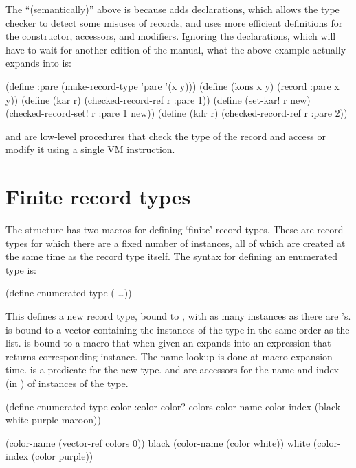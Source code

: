 The ``(semantically)'' above is because  adds
 declarations, which allows the type checker to detect some misuses of records,
 and uses more efficient definitions for the constructor, accessors, and
 modifiers.
Ignoring the declarations, which will have to wait for another edition of
 the manual, what the above example actually expands into is:
\begin{example}
(define :pare (make-record-type 'pare '(x y)))
(define (kons x y) (record :pare x y))
(define (kar r) (checked-record-ref r :pare 1))
(define (set-kar! r new)
  (checked-record-set! r :pare 1 new))
(define (kdr r) (checked-record-ref r :pare 2))
\end{example} 
 and  are
 low-level procedures that check the type of the
 record and access or modify it using a single VM instruction.

\section{Finite record types}

The structure  has
 two macros for defining `finite' record types.
These are record types for which there are a fixed number of instances,
 all of which are created at the same time as the record type itself.
The syntax for defining an enumerated type is:
\begin{example}
(define-enumerated-type  
  ( \ldots))
\end{example}
This defines a new record type, bound to , with as many
 instances as there are 's.
 is bound to a vector containing the instances
 of the type in the same order as the  list.
 is bound to a macro that when given an  expands
 into an expression that returns corresponding instance.
The name lookup is done at macro expansion time.
 is a predicate for the new type.
 and  are accessors for the
 name and index (in ) of instances of the type.

\begin{example}
(define-enumerated-type color :color
  color?
  colors
  color-name
  color-index
  (black white purple maroon))

(color-name (vector-ref colors 0)) \evalsto black
(color-name (color white))         \evalsto white
(color-index (color purple))       
\end{example}

